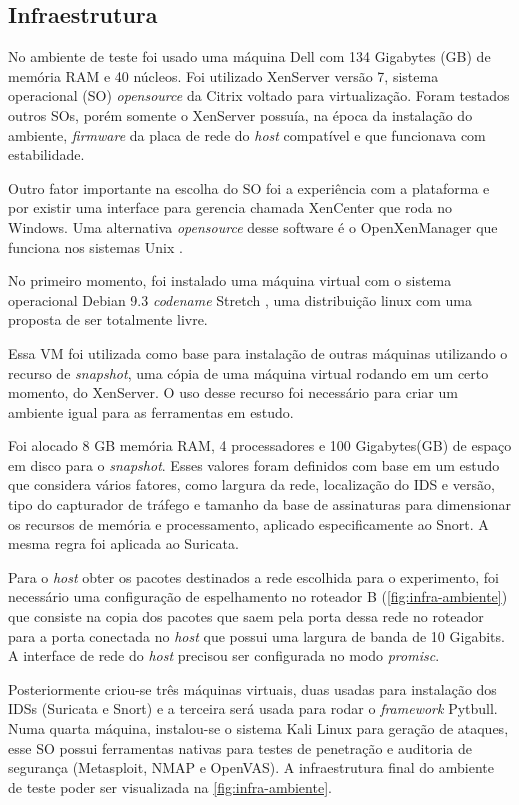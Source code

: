 \subsection{Infraestrutura} \label{sec:infraestrutura}

No ambiente de teste foi usado uma máquina Dell com 134 Gigabytes (GB) de memória RAM e 40 núcleos. Foi utilizado XenServer \cite{xenserver} versão 7, sistema operacional (SO) \textit{opensource} da Citrix voltado para virtualização. Foram testados outros SOs, porém somente o XenServer possuía, na época da instalação do ambiente, \textit{firmware} da placa de rede do \textit{host} compatível e que funcionava com estabilidade. 
 
Outro fator importante na escolha do SO foi a experiência com a plataforma e por existir uma interface para gerencia chamada XenCenter que roda no Windows. Uma alternativa \textit{opensource} desse software é o OpenXenManager que funciona nos sistemas Unix \cite{openxenmanager}.

No primeiro momento, foi instalado uma máquina virtual com o sistema operacional Debian 9.3 \textit{codename} Stretch \cite{debianwheezy}, uma distribuição linux com uma proposta de ser totalmente livre.

Essa VM foi utilizada como base para instalação de outras máquinas utilizando o recurso de \textit{snapshot}, uma cópia de uma máquina virtual rodando em um certo momento, do XenServer. O uso desse recurso foi necessário para criar um ambiente igual para as ferramentas em estudo.

Foi alocado 8 GB memória RAM, 4 processadores e 100 Gigabytes(GB) de espaço em disco para o \textit{snapshot}. Esses valores foram definidos com base em um estudo \cite{mikelococo} que considera vários fatores, como largura da rede, localização do IDS e versão, tipo do capturador de tráfego e tamanho da base de assinaturas para dimensionar os recursos de memória e processamento, aplicado especificamente ao Snort. A mesma regra foi aplicada ao Suricata.

Para o \textit{host} obter os pacotes destinados a rede escolhida para o experimento, foi necessário uma configuração de espelhamento no roteador B (\autoref{fig:infra-ambiente}) que consiste na copia dos pacotes que saem pela porta dessa rede no roteador para a porta conectada no \textit{host} que possui uma largura de banda de 10 Gigabits. A interface de rede do \textit{host} precisou ser configurada no modo \textit{promisc}.

Posteriormente criou-se três máquinas virtuais, duas usadas para instalação dos IDSs (Suricata e Snort) e a terceira será usada para rodar o \textit{framework} Pytbull. Numa quarta máquina, instalou-se o sistema Kali Linux \cite{kalilinux} para geração de ataques, esse SO possui ferramentas nativas para testes de penetração e auditoria de segurança (Metasploit, NMAP e OpenVAS). A infraestrutura final do ambiente de teste poder ser visualizada na \autoref{fig:infra-ambiente}.

